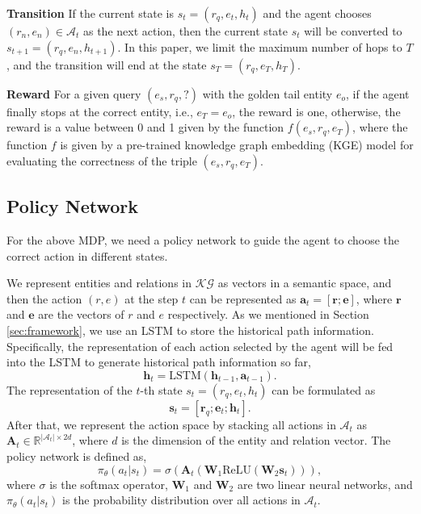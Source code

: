 \documentclass[11pt,a4paper]{article}
\begin{document}
\textbf{Transition} \indent If the current state is $s_t = (r_q, e_t, h_t)$ and the agent chooses $(r_n, e_n) \in \mathcal{A}_t$ as the next action, then the current state $s_t$ will be converted to $s_{t+1} = (r_q, e_n, h_{t+1})$. In this paper, we limit the maximum number of hops to $T$, and the transition will end at the state $s_T = (r_q, e_T, h_T)$.

\textbf{Reward} \indent For a given query $(e_s, r_q, ?)$ with the golden tail entity $e_o$, if the agent finally stops at the correct entity, i.e., $e_T = e_o$, the reward is one, otherwise, the reward is a value between 0 and 1 given by the function $f(e_s, r_q, e_T)$, where the function $f$ is given by a pre-trained knowledge graph embedding (KGE) model for evaluating the correctness of the triple $(e_s, r_q, e_T)$.

\subsection{Policy Network}

For the above MDP, we need a policy network to guide the agent to choose the correct action in different states. 

We represent entities and relations in $\mathcal{KG}$ as vectors in a semantic space, and then the action $(r, e)$ at the step $t$ can be represented as $\mathbf{a}_t = [\mathbf{r}; \mathbf{e}]$, where $\mathbf{r}$ and $\mathbf{e}$ are the vectors of $r$ and $e$ respectively. As we mentioned in Section \ref{sec:framework}, we use an LSTM to store the historical path information. Specifically, the representation of each action selected by the agent will be fed into the LSTM to generate historical path information so far,
\begin{equation}
  \mathbf{h}_t = \text{LSTM}(\mathbf{h}_{t - 1}, \mathbf{a}_{t - 1}) .
\end{equation}
The representation of the $t$-th state $s_t = (r_q, e_t, h_t)$ can be formulated as 
\begin{equation}
\label{eq:state}
  \mathbf{s}_t = [\mathbf{r}_q; \mathbf{e}_t;  \mathbf{h}_t] .
\end{equation}
After that, we represent the action space by stacking all actions in $\mathcal{A}_t$ as $\mathbf{A}_t \in \mathbb{R}^{|\mathcal{A}_t| \times 2d}$, where $d$ is the dimension of the entity and relation vector. The policy network is defined as,
\begin{equation}
  \pi_{\theta} (a_t | s_t) = \sigma(\mathbf{A}_t(\mathbf{W}_1 \text{ReLU} (\mathbf{W}_2  \mathbf{s}_t))) ,
\end{equation}
where $\sigma$ is the softmax operator, $\mathbf{W}_1$ and $\mathbf{W}_2$ are two linear neural networks, and $\pi_{\theta} (a_t | s_t)$ is the probability distribution over all actions in $\mathcal{A}_t$.
\end{document}
